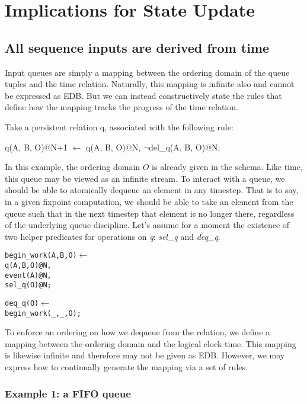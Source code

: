 \section{Implications for State Update}

\subsection{All sequence inputs are derived from time}

Input queues are simply a mapping between the ordering domain of the queue tuples and the time relation.  Naturally, this mapping
is infinite also and cannot be expressed as EDB.  But we can instead constructively state the rules that define how the mapping 
tracks the progress of the time relation.

Take a persistent relation q, associated with the following rule:

\begin{Dedalus}
q(A, B, O)@N+1 \(\leftarrow\)
  q(A, B, O)@N, 
  \(\lnot\)del\_q(A, B, O)@N;
\end{Dedalus}

In this example, the ordering domain $O$ is already given in the schema.  Like time, this queue may be viewed as an infinite stream.
To interact with a queue, we should be able to atomically dequeue an element in any timestep.  That is to say, in a given fixpoint computation,
we should be able to take an element from the queue such that in the next timestep that element is no longer there, regardless of the
underlying queue discipline.  Let's assume for a moment the existence of two helper predicates for operations on \emph{q}: \emph{sel\_q} and
\emph{deq\_q}.  


\begin{alltt}
begin_work(A, B, O) \(\leftarrow\)
  q(A, B, O)@N,
  event(A)@N, 
  sel_q(O)@N;
  
  
deq_q(O) \(\leftarrow\) 
  begin_work(_, _, O);
\end{alltt}


To enforce an ordering on how we dequeue from the relation, we define a mapping between the ordering domain and the logical clock
time.  This mapping is likewise infinite and therefore may not be given as EDB.  However, we may express how to continually generate 
the mapping via a set of rules.

\subsubsection{Example 1: a FIFO queue}

